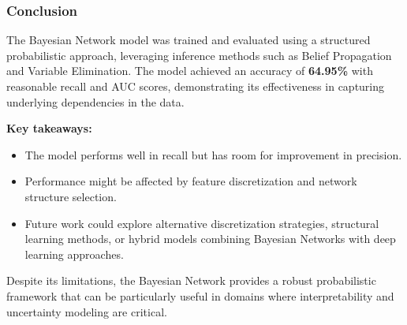 \subsubsection{Conclusion}

The Bayesian Network model was trained and evaluated using a structured probabilistic approach, leveraging inference methods such as Belief Propagation and Variable Elimination. The model achieved an accuracy of \textbf{64.95\%} with reasonable recall and AUC scores, demonstrating its effectiveness in capturing underlying dependencies in the data.

\textbf{Key takeaways:}
\begin{itemize}
    \item The model performs well in recall but has room for improvement in precision.
    \item Performance might be affected by feature discretization and network structure selection.
    \item Future work could explore alternative discretization strategies, structural learning methods, or hybrid models combining Bayesian Networks with deep learning approaches.
\end{itemize}

Despite its limitations, the Bayesian Network provides a robust probabilistic framework that can be particularly useful in domains where interpretability and uncertainty modeling are critical.

\newpage